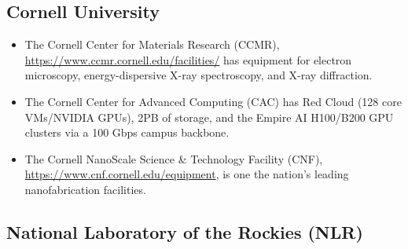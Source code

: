 \documentclass{NSF}
\begin{document}


\subsection{Cornell University}\hfill

\begin{itemize}

\item The Cornell Center for Materials Research (CCMR), \href{https://www.ccmr.cornell.edu/facilities/}{https://www.ccmr.cornell.edu/facilities/} has equipment for electron microscopy, energy-dispersive X-ray spectroscopy, and X-ray diffraction.  

\item The Cornell Center for Advanced Computing (CAC) has Red Cloud (128 core VMs/NVIDIA GPUs), 2PB of storage, and the Empire AI H100/B200 GPU clusters via a 100 Gbps campus backbone.

\item The Cornell NanoScale Science \& Technology Facility (CNF), \href{https://www.cnf.cornell.edu/equipment}{https://www.cnf.cornell.edu/equipment}, is one the nation's leading nanofabrication facilities.

\end{itemize}



\subsection{National Laboratory of the Rockies (NLR)}
\end{document}
